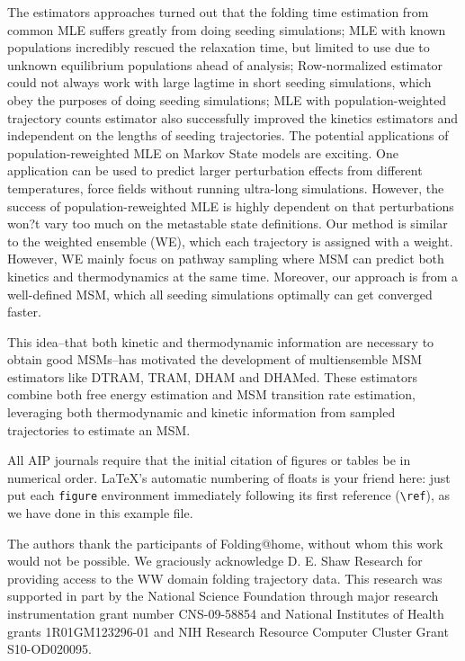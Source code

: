 \documentclass[%
 aip,
rsi,%
 amsmath,amssymb,
 reprint,%
]{revtex4-1}
\begin{document}
The estimators approaches turned out that the folding time estimation from common MLE suffers greatly from doing seeding simulations; MLE with known populations incredibly rescued the relaxation time, but limited to use due to unknown equilibrium populations ahead of analysis; Row-normalized estimator could not always work with large lagtime in short seeding simulations, which obey the purposes of doing seeding simulations; MLE with population-weighted trajectory counts estimator also successfully improved the kinetics estimators and independent on the lengths of seeding trajectories. The potential applications of population-reweighted MLE on Markov State models are exciting. One application can be used to predict larger perturbation effects from different temperatures, force fields without running ultra-long simulations. However, the success of population-reweighted MLE is highly dependent on that perturbations won?t vary too much on the metastable state definitions.  Our method is similar to the weighted ensemble (WE), which each trajectory is assigned with a weight. However, WE mainly focus on pathway sampling where MSM can predict both kinetics and thermodynamics at the same time. Moreover, our approach is from a well-defined MSM, which all seeding simulations optimally can get converged faster. 

This idea--that both kinetic and thermodynamic information are necessary to obtain good MSMs--has motivated the development of multiensemble MSM estimators like DTRAM, TRAM, DHAM and DHAMed. These estimators combine both free energy estimation and MSM transition rate estimation, leveraging both thermodynamic and kinetic information from sampled trajectories to estimate an MSM.

All AIP journals require that the initial citation of
figures or tables be in numerical order.
\LaTeX's automatic numbering of floats is your friend here:
just put each \texttt{figure} environment immediately following 
its first reference (\verb+\ref+), as we have done in this example file. 

\begin{acknowledgments}
The authors thank the participants of Folding@home, without whom this work would not be possible.  We graciously acknowledge D. E. Shaw Research for providing access to the WW domain folding trajectory data. This research was supported in part by the National Science Foundation through major research instrumentation grant number CNS-09-58854 and National Institutes of Health grants 1R01GM123296-01 and NIH Research Resource Computer Cluster Grant S10-OD020095.
\end{acknowledgments}
\end{document}
